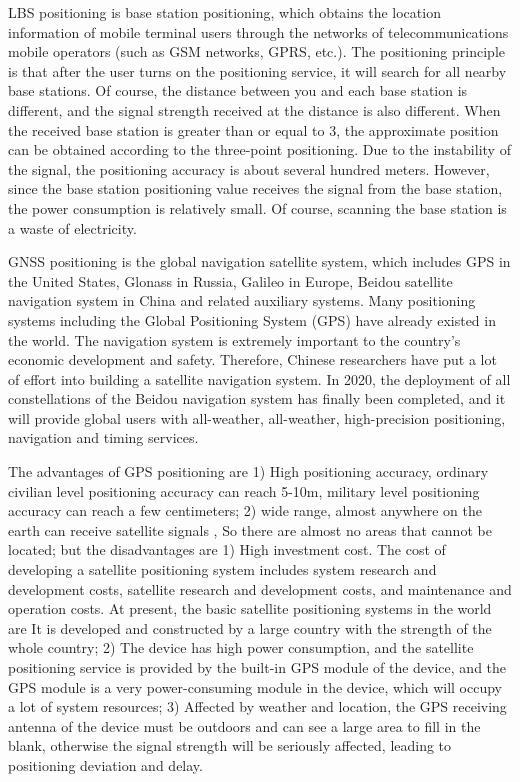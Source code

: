 \documentclass[conference]{IEEEtran}
\begin{document}
LBS positioning is base station positioning, which obtains the location information of mobile terminal users through the networks of telecommunications mobile operators (such as GSM networks, GPRS, etc.). The positioning principle is that after the user turns on the positioning service, it will search for all nearby base stations. Of course, the distance between you and each base station is different, and the signal strength received at the distance is also different. When the received base station is greater than or equal to 3, the approximate position can be obtained according to the three-point positioning. \cite{indoor-review} Due to the instability of the signal, the positioning accuracy is about several hundred meters. However, since the base station positioning value receives the signal from the base station, the power consumption is relatively small. Of course, scanning the base station is a waste of electricity.

GNSS positioning is the global navigation satellite system, which includes GPS in the United States, Glonass in Russia, Galileo in Europe, Beidou satellite navigation system in China and related auxiliary systems. Many positioning systems including the Global Positioning System (GPS) have already existed in the world. The \cite{gps-2} navigation system is extremely important to the country’s economic development and safety. Therefore, Chinese researchers have put a lot of effort into building a satellite navigation system. In 2020, the deployment of all constellations of the Beidou navigation system has finally been completed, and it will provide global users with all-weather, all-weather, high-precision positioning, navigation and timing services.

The advantages of GPS positioning are 1) High positioning accuracy, ordinary civilian level positioning accuracy can reach 5-10m, military level positioning accuracy can reach a few centimeters; 2) wide range, almost anywhere on the earth can receive satellite signals , So there are almost no areas that cannot be located; but the disadvantages are 1) High investment cost. The cost of developing a satellite positioning system includes system research and development costs, satellite research and development costs, and maintenance and operation costs. At present, the basic satellite positioning systems in the world are It is developed and constructed by a large country with the strength of the whole country; 2) The device has high power consumption, and the satellite positioning service is provided by the built-in GPS module of the device, and the GPS module is a very power-consuming module in the device, which will occupy a lot of system resources; 3) Affected by weather and location, the GPS receiving antenna of the device must be outdoors and can see a large area to fill in the blank, otherwise the signal strength will be seriously affected, leading to positioning deviation and delay.
\end{document}
